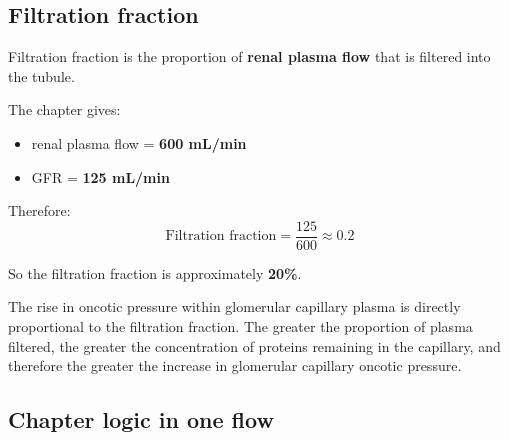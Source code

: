 \documentclass[11pt,a4paper]{article}
\begin{document}
\subsection{Filtration fraction}

Filtration fraction is the proportion of \textbf{renal plasma flow} that is filtered into the tubule.

The chapter gives:
\begin{itemize}
    \item renal plasma flow = \textbf{600 mL/min}
    \item GFR = \textbf{125 mL/min}
\end{itemize}

Therefore:
\[
\text{Filtration fraction} = \frac{125}{600} \approx 0.2
\]

So the filtration fraction is approximately \textbf{20\%}.

The rise in oncotic pressure within glomerular capillary plasma is directly proportional to the filtration fraction. The greater the proportion of plasma filtered, the greater the concentration of proteins remaining in the capillary, and therefore the greater the increase in glomerular capillary oncotic pressure.

\subsection{Chapter logic in one flow}
\end{document}
